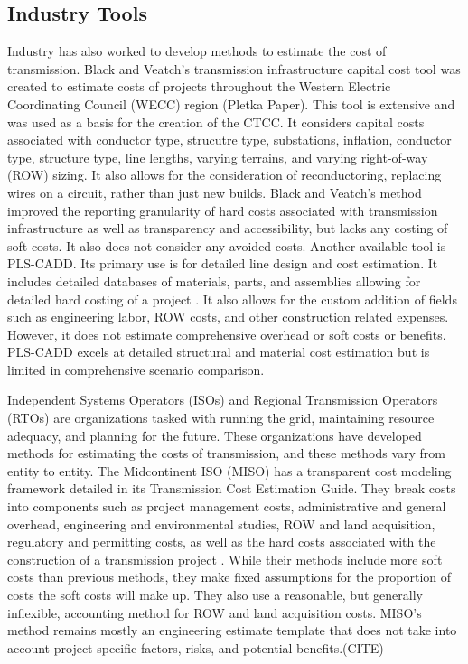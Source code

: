 \documentclass[11pt,twocolumn,a4paper]{article}
\begin{document}
\subsection{Industry Tools}
Industry has also worked to develop methods to estimate the cost of transmission. Black and Veatch's transmission infrastructure capital cost tool was created to estimate costs of projects throughout the Western Electric Coordinating Council (WECC) region (Pletka Paper). This tool is extensive and was used as a basis for the creation of the CTCC. It considers capital costs associated with conductor type, strucutre type, substations, inflation, conductor type, structure type, line lengths, varying terrains, and varying right-of-way (ROW) sizing. It also allows for the consideration of reconductoring, replacing wires on a circuit, rather than just new builds. Black and Veatch's method improved the reporting granularity of hard costs associated with transmission infrastructure as well as transparency and accessibility, but lacks any costing of soft costs. It also does not consider any avoided costs. Another available tool is PLS-CADD. Its primary use is for detailed line design and cost estimation. It includes detailed databases of materials, parts, and assemblies allowing for detailed hard costing of a project \parencite{PLSCADD2012}. It also allows for the custom addition of fields such as engineering labor, ROW costs, and other construction related expenses. However, it does not estimate comprehensive overhead or soft costs or benefits. PLS-CADD excels at detailed structural and material cost estimation but is limited in comprehensive scenario comparison.

Independent Systems Operators (ISOs) and Regional Transmission Operators (RTOs) are organizations tasked with running the grid, maintaining resource adequacy, and planning for the future. These organizations have developed methods for estimating the costs of transmission, and these methods vary from entity to entity. The Midcontinent ISO (MISO) has a transparent cost modeling framework detailed in its Transmission Cost Estimation Guide. They break costs into components such as project management costs, administrative and general overhead, engineering and environmental studies, ROW and land acquisition, regulatory and permitting costs, as well as the hard costs associated with the construction of a transmission project \parencite{MISO2024CostGuide}. While their methods include more soft costs than previous methods, they make fixed assumptions for the proportion of costs the soft costs will make up. They also use a reasonable, but generally inflexible, accounting method for ROW and land acquisition costs. MISO's method remains mostly an engineering estimate template that does not take into account project-specific factors, risks, and potential benefits.(CITE)
\end{document}

